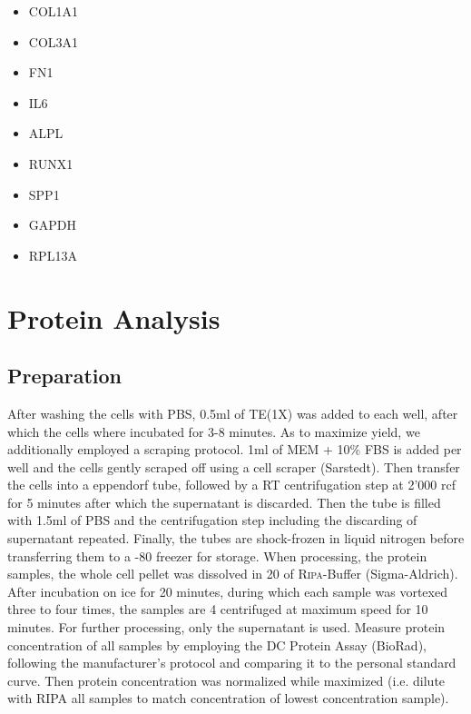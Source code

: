 \begin{itemize}
\item COL1A1
\item COL3A1
\item FN1
\item IL6
\item ALPL
\item RUNX1
\item SPP1
\item GAPDH 
\item RPL13A
\end{itemize}

\section{Protein Analysis}
\subsection{Preparation}
After washing the cells with PBS, 0.5ml of TE(1X) was added to each well, after which the cells where incubated for 3-8 minutes. As to maximize yield, we additionally employed a scraping protocol. 1ml of MEM\textalpha{} + 10\% FBS is added per well and the cells gently scraped off using a cell scraper (Sarstedt). Then transfer the cells into a eppendorf tube, followed by a RT centrifugation step at 2'000 rcf for 5 minutes after which the supernatant is discarded. Then the tube is filled with 1.5ml of PBS and the centrifugation step including the discarding of supernatant repeated. Finally, the tubes are shock-frozen in liquid nitrogen before transferring them to a -80 \degC freezer for storage. When processing, the protein samples, the whole cell pellet was dissolved in 20\mul{} of \textsc{Ripa}-Buffer (Sigma-Aldrich). After incubation on ice for 20 minutes, during which each sample was vortexed three to four times, the samples are 4 \degC centrifuged at maximum speed for 10 minutes. For further processing, only the supernatant is used. Measure protein concentration of all samples by employing the DC\texttrademark{} Protein Assay (BioRad), following the manufacturer's protocol and comparing it to the personal standard curve. Then protein concentration was normalized while maximized (i.e. dilute with RIPA all samples to match concentration of lowest concentration sample). 


